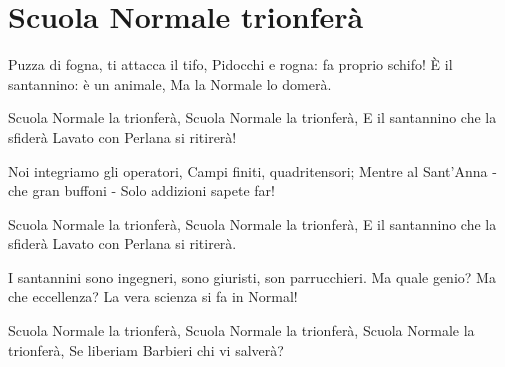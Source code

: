 \section{Scuola Normale trionferà}
\subtitle{Sulla melodia di “Bandiera Rossa”}

\subtitle{Tonalità possibilmente bassa}
\begin{canzone}
Puzza di fogna, ti attacca il tifo,
Pidocchi e rogna: fa proprio schifo!
È il santannino: è un animale,
Ma la Normale lo domerà.

Scuola Normale la trionferà,
Scuola Normale la trionferà,
E il santannino che la sfiderà
Lavato con Perlana si ritirerà!

Noi integriamo gli operatori,
Campi finiti, quadritensori;
Mentre al Sant’Anna - che gran buffoni - 
Solo addizioni sapete far!

Scuola Normale la trionferà,
Scuola Normale la trionferà,
E il santannino che la sfiderà
Lavato con Perlana si ritirerà.

I santannini sono ingegneri,
sono giuristi, son parrucchieri.
Ma quale genio? Ma che eccellenza?
La vera scienza si fa in Normal!

Scuola Normale la trionferà,
Scuola Normale la trionferà,
Scuola Normale la trionferà,
Se liberiam Barbieri chi vi salverà?
\end{canzone}
